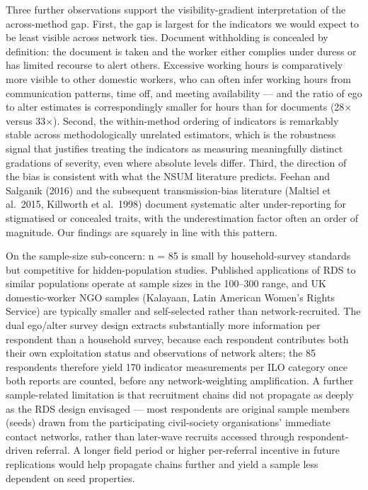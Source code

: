 \documentclass[
  12pt,
  letterpaper,
  DIV=11,
  numbers=noendperiod]{scrartcl}
\begin{document}
Three further observations support the visibility-gradient
interpretation of the across-method gap. First, the gap is largest for
the indicators we would expect to be least visible across network ties.
Document withholding is concealed by definition: the document is taken
and the worker either complies under duress or has limited recourse to
alert others. Excessive working hours is comparatively more visible to
other domestic workers, who can often infer working hours from
communication patterns, time off, and meeting availability --- and the
ratio of ego to alter estimates is correspondingly smaller for hours
than for documents (28× versus 33×). Second, the within-method ordering
of indicators is remarkably stable across methodologically unrelated
estimators, which is the robustness signal that justifies treating the
indicators as measuring meaningfully distinct gradations of severity,
even where absolute levels differ. Third, the direction of the bias is
consistent with what the NSUM literature predicts. Feehan and Salganik
(2016) and the subsequent transmission-bias literature (Maltiel et
al.~2015, Killworth et al.~1998) document systematic alter
under-reporting for stigmatised or concealed traits, with the
underestimation factor often an order of magnitude. Our findings are
squarely in line with this pattern.

On the sample-size sub-concern: n = 85 is small by household-survey
standards but competitive for hidden-population studies. Published
applications of RDS to similar populations operate at sample sizes in
the 100--300 range, and UK domestic-worker NGO samples (Kalayaan, Latin
American Women's Rights Service) are typically smaller and self-selected
rather than network-recruited. The dual ego/alter survey design extracts
substantially more information per respondent than a household survey,
because each respondent contributes both their own exploitation status
and observations of network alters; the 85 respondents therefore yield
170 indicator measurements per ILO category once both reports are
counted, before any network-weighting amplification. A further
sample-related limitation is that recruitment chains did not propagate
as deeply as the RDS design envisaged --- most respondents are original
sample members (seeds) drawn from the participating civil-society
organisations' immediate contact networks, rather than later-wave
recruits accessed through respondent-driven referral. A longer field
period or higher per-referral incentive in future replications would
help propagate chains further and yield a sample less dependent on seed
properties.
\end{document}
